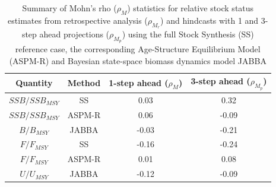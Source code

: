 \documentclass[11pt,a4paper]{article}
\begin{document}
{\begin{table}[!ht]
\caption{Summary of Mohn's rho ($\rho_{M}$) statistics for relative stock status estimates from retrospective analysis ($\rho_{M_r}$) and hindcasts with 1 and 3-step ahead projections ($\rho_{M_p}$) using the full Stock Synthesis (SS) reference case, the corresponding Age-Structure Equilibrium Model (ASPM-R) and Bayesian state-space biomass dynamics model JABBA}  
\begin{center}
\label{tab:retro-rho}
\begin{tabular}{|cccc|}
\hline
{\small Quantity} & \small Method & {\small 1-step ahead ($\rho_{M}$)} & {\small 3-step ahead ($\rho_{M_p}$)} \\ 
\hline\hline
{\small $SSB/SSB_{MSY}$     } & {\small SS} 	 & {\small    0.03} & {\small  0.32}      \\
{\small $SSB/SSB_{MSY}$     } & {\small ASPM-R} 	 & {\small    0.06} & {\small -0.09}      \\
{\small $B/B_{MSY}$         } & {\small JABBA} 	 & {\small   -0.03} & {\small -0.21}      \\
{\small $F/F_{MSY}$         } & {\small SS} 	 & {\small   -0.16} & {\small -0.24}      \\
{\small $F/F_{MSY}$         } & {\small ASPM-R} 	 & {\small    0.01} & {\small  0.08}      \\
{\small $U/U_{MSY}$         } & {\small JABBA} 	 & {\small   -0.12} & {\small -0.09}      \\
\hline
\end{tabular}
\end{center}
\end{table}

}
\end{document}
